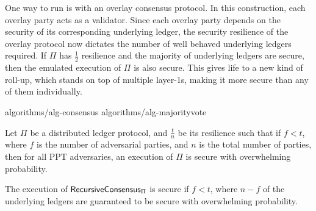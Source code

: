 \label{sec:consensus}

One way to run \rollerblade is with an overlay consensus protocol.
In this construction, each overlay party acts as a validator.
Since each overlay party depends on the security of its
corresponding underlying ledger, the security resilience
of the overlay protocol now dictates the number of well
behaved underlying ledgers required.
If $\Pi$ has $\frac{1}{2}$ resilience and the majority of underlying
ledgers are secure, then the emulated execution of $\Pi$ is also secure.
This gives life to a new kind of roll-up, which stands on top of multiple
layer-1s, making it more secure than any of them individually.


{algorithms/alg-consensus}
{algorithms/alg-majorityvote}

\begin{conjecture}[Security]
  Let $\Pi$ be a distributed ledger protocol, and $\frac{t}{n}$ be its resilience such
  that if $f < t$, where $f$ is the number of adversarial parties, and $n$ is the total number of parties,
  then for all PPT adversaries, an execution of $\Pi$ is secure with overwhelming probability.

  The execution of $\textsf{RecursiveConsensus}_{\Pi}$ is secure if $f < t$, where $n - f$ of the
  underlying ledgers are guaranteed to be secure with overwhelming probability.

\end{conjecture}

%
